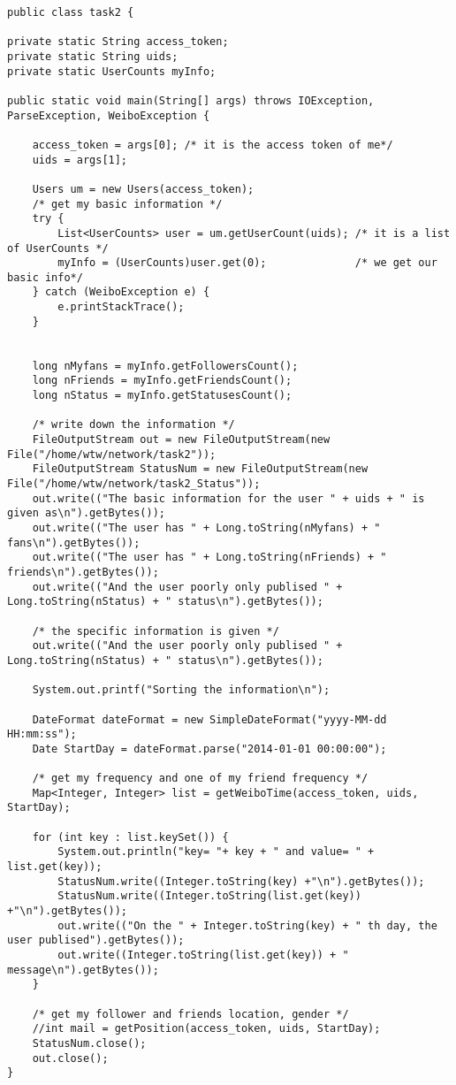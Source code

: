 \documentclass{article}
\begin{document}
\begin{lstlisting}
public class task2 {

private static String access_token;
private static String uids;
private static UserCounts myInfo;

public static void main(String[] args) throws IOException, ParseException, WeiboException {

	access_token = args[0]; /* it is the access token of me*/
	uids = args[1];

	Users um = new Users(access_token);
	/* get my basic information */
	try {
		List<UserCounts> user = um.getUserCount(uids); /* it is a list of UserCounts */
		myInfo = (UserCounts)user.get(0);              /* we get our basic info*/
	} catch (WeiboException e) {
		e.printStackTrace();
	}


	long nMyfans = myInfo.getFollowersCount();
	long nFriends = myInfo.getFriendsCount();
	long nStatus = myInfo.getStatusesCount();

	/* write down the information */
	FileOutputStream out = new FileOutputStream(new File("/home/wtw/network/task2"));   
	FileOutputStream StatusNum = new FileOutputStream(new File("/home/wtw/network/task2_Status"));   
	out.write(("The basic information for the user " + uids + " is given as\n").getBytes());
	out.write(("The user has " + Long.toString(nMyfans) + " fans\n").getBytes());
	out.write(("The user has " + Long.toString(nFriends) + " friends\n").getBytes());
	out.write(("And the user poorly only publised " + Long.toString(nStatus) + " status\n").getBytes());

	/* the specific information is given */
	out.write(("And the user poorly only publised " + Long.toString(nStatus) + " status\n").getBytes());

	System.out.printf("Sorting the information\n");

	DateFormat dateFormat = new SimpleDateFormat("yyyy-MM-dd HH:mm:ss");
	Date StartDay = dateFormat.parse("2014-01-01 00:00:00");
		
	/* get my frequency and one of my friend frequency */
	Map<Integer, Integer> list = getWeiboTime(access_token, uids, StartDay);
	
	for (int key : list.keySet()) {
		System.out.println("key= "+ key + " and value= " + list.get(key));
		StatusNum.write((Integer.toString(key) +"\n").getBytes());
		StatusNum.write((Integer.toString(list.get(key)) +"\n").getBytes());
		out.write(("On the " + Integer.toString(key) + " th day, the user publised").getBytes());
		out.write((Integer.toString(list.get(key)) + " message\n").getBytes());
	}
		
	/* get my follower and friends location, gender */
	//int mail = getPosition(access_token, uids, StartDay);
	StatusNum.close();
	out.close();
}
\end{lstlisting}
\end{document}
